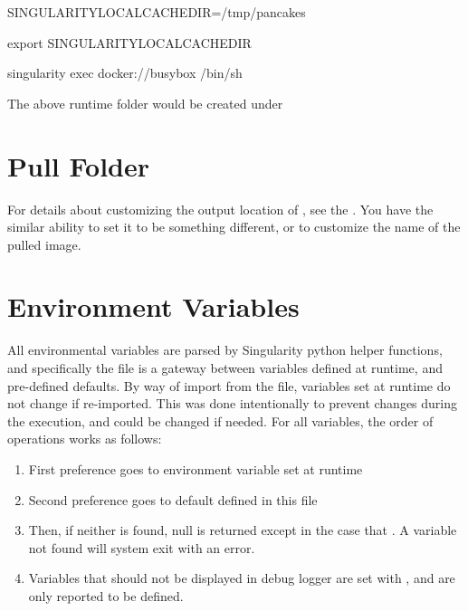 \documentclass[letterpaper,10pt,english]{sphinxmanual}
\begin{document}
%
\begin{sphinxVerbatim}[commandchars=\\\{\}]
SINGULARITY\PYGZus{}LOCALCACHEDIR=/tmp/pancakes

export SINGULARITY\PYGZus{}LOCALCACHEDIR

singularity exec docker://busybox /bin/sh
\end{sphinxVerbatim}

The above runtime folder would be created under 


\section{Pull Folder}
\label{\detokenize{build_environment:pull-folder}}
For details about customizing the output location of {\hyperref[\detokenize{appendix:pull-command}]{}}, see the
{\hyperref[\detokenize{appendix:pull-command}]{}}. You have the similar ability to set it to be something
different, or to customize the name of the pulled image.


\section{Environment Variables}
\label{\detokenize{build_environment:environment-variables}}
All environmental variables are parsed by Singularity python helper
functions, and specifically the file  is a gateway
between variables defined at runtime, and pre-defined defaults. By way
of import from the file, variables set at runtime do not change if
re-imported. This was done intentionally to prevent changes during the
execution, and could be changed if needed. For all variables, the
order of operations works as follows:
\begin{enumerate}
\item {} 
First preference goes to environment variable set at runtime

\item {} 
Second preference goes to default defined in this file

\item {} 
Then, if neither is found, null is returned except in the case that .
A  variable not found will system exit with an error.

\item {} 
Variables that should not be displayed in debug logger are set with ,
and are only reported to be defined.

\end{enumerate}
\end{document}
